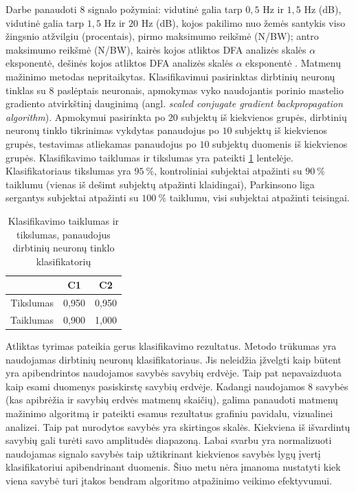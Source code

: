 \documentclass[]{vgtuef}
\begin{document}
Darbe panaudoti $8$ signalo požymiai: vidutinė galia tarp $0,5$ Hz ir $1,5$ Hz (dB), vidutinė galia tarp $1,5$ Hz ir $20$ Hz (dB), kojos pakilimo nuo žemės santykis viso žingsnio atžvilgiu (procentais), pirmo maksimumo reikšmė (N/BW); antro maksimumo reikšmė (N/BW), kairės kojos atliktos DFA analizės skalės $\alpha$ eksponentė, dešinės kojos atliktos DFA analizės skalės $\alpha$ eksponentė \cite{Hausdorff01011997}. Matmenų mažinimo metodas nepritaikytas. Klasifikavimui pasirinktas dirbtinių neuronų tinklas su $8$ paslėptais neuronais, apmokymas vyko naudojantis porinio mastelio gradiento atvirkštinį dauginimą (angl. \textit{scaled conjugate gradient backpropagation algorithm}). Apmokymui pasirinkta po $20$ subjektų iš kiekvienos grupės, dirbtinių neuronų tinklo tikrinimas vykdytas panaudojus po $10$ subjektų iš kiekvienos grupės, testavimas atliekamas panaudojus po $10$ subjektų duomenis iš kiekvienos grupės. Klasifikavimo taiklumas ir tikslumas yra pateikti \ref{table:vgtu_ann_scores} lentelėje. Klasifikatoriaus tikslumas yra $95~\%$, kontroliniai subjektai atpažinti su $90~\%$ taiklumu (vienas iš dešimt subjektų atpažinti klaidingai), Parkinsono liga sergantys subjektai atpažinti su $100~\%$ taiklumu, visi subjektai atpažinti teisingai.

\begin{table}
  \centering
  \renewcommand{\arraystretch}{1.3}
  \caption{Klasifikavimo taiklumas ir tikslumas, panaudojus dirbtinių neuronų tinklo klasifikatorių \cite{vgtu}}
  \label{table:vgtu_ann_scores}
  \begin{tabular}{|c|c|c|} \hline
    & C1 & C2 \\ \hline
    Tikslumas & 0,950 & 0,950 \\ \hline
    Taiklumas & 0,900 & 1,000 \\ \hline
  \end{tabular}
\end{table}

Atliktas tyrimas pateikia gerus klasifikavimo rezultatus. Metodo trūkumas yra naudojamas dirbtinių neuronų klasifikatoriaus. Jis neleidžia įžvelgti kaip būtent yra apibendrintos naudojamos savybės savybių erdvėje. Taip pat nepavaizduota kaip esami duomenys pasiskirstę savybių erdvėje. Kadangi naudojamos $8$ savybės (kas apibrėžia ir savybių erdvės matmenų skaičių), galima panaudoti matmenų mažinimo algoritmą ir pateikti esamus rezultatus grafiniu pavidalu, vizualinei analizei. Taip pat nurodytos savybės yra skirtingos skalės. Kiekviena iš išvardintų savybių gali turėti savo amplitudės diapazoną. Labai svarbu yra normalizuoti naudojamas signalo savybės taip užtikrinant kiekvienos savybės lygų įvertį klasifikatoriui apibendrinant duomenis. Šiuo metu nėra įmanoma nustatyti kiek viena savybė turi įtakos bendram algoritmo atpažinimo veikimo efektyvumui.
\end{document}

